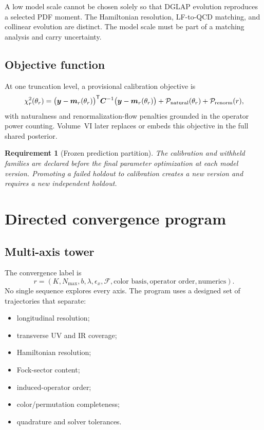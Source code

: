 \documentclass[11pt]{article}
\newtheorem{requirement}[definition]{Requirement}
\newcommand{\cP}{\mathcal P}
\newcommand{\cF}{\mathcal F}
\begin{document}
A low model scale cannot be chosen solely so that DGLAP evolution reproduces a
selected PDF moment.  The Hamiltonian resolution, LF-to-QCD matching, and
collinear evolution are distinct.  The model scale must be part of a matching
analysis and carry uncertainty.

\subsection{Objective function}

At one truncation level, a provisional calibration objective is
\begin{equation}
 \chi_r^2(\theta_r)
 =\bigl(\bm y_{\cal}-\bm m_r(\theta_r)\bigr)^{\mathsf T}
 \bm C_{\cal}^{-1}
 \bigl(\bm y_{\cal}-\bm m_r(\theta_r)\bigr)
 +\cP_{\rm natural}(\theta_r)
 +\cP_{\rm renorm}(r),
 \label{eq:calibration-objective}
\end{equation}
with naturalness and renormalization-flow penalties grounded in the operator
power counting.  Volume~VI later replaces or embeds this objective in the full
shared posterior.

\begin{requirement}[Frozen prediction partition]
The calibration and withheld families are declared before the final parameter
optimization at each model version.  Promoting a failed holdout to calibration
creates a new version and requires a new independent holdout.
\label{req:frozen-holdout}
\end{requirement}

\section{Directed convergence program}
\label{sec:convergence}

\subsection{Multi-axis tower}

The convergence label is
\begin{equation}
 r=(K,N_{\max},b,\lambda,\epsilon_x,
 \cF,\text{color basis},\text{operator order},\text{numerics}).
 \label{eq:full-convergence-label}
\end{equation}
No single sequence explores every axis.  The program uses a designed set of
trajectories that separate:
\begin{itemize}
 \item longitudinal resolution;
 \item transverse UV and IR coverage;
 \item Hamiltonian resolution;
 \item Fock-sector content;
 \item induced-operator order;
 \item color/permutation completeness;
 \item quadrature and solver tolerances.
\end{itemize}
\end{document}
